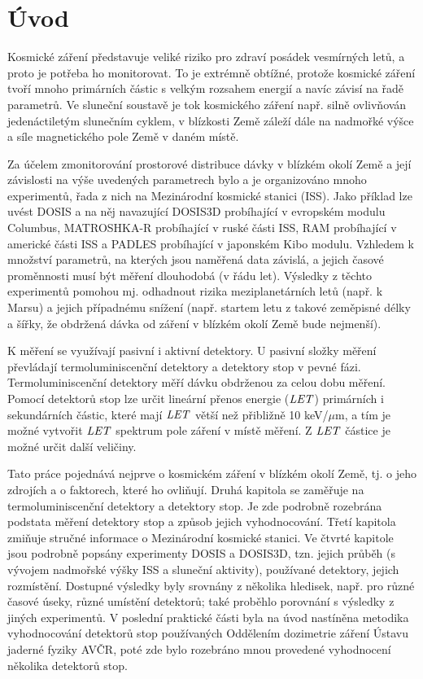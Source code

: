 \chapter*{Úvod}
\markright{}
Kosmické záření představuje veliké riziko pro zdraví posádek vesmírných letů, a proto je potřeba ho monitorovat. To je extrémně obtížné, protože kosmické záření tvoří mnoho primárních částic s velkým rozsahem energií a navíc závisí na řadě parametrů. Ve sluneční soustavě je tok kosmického záření např. silně ovlivňován jedenáctiletým slunečním cyklem, v blízkosti Země záleží dále na nadmořké výšce a síle magnetického pole Země v daném místě. 

Za účelem zmonitorování prostorové distribuce dávky v blízkém okolí Země a její závislosti na výše uvedených parametrech bylo a je organizováno mnoho experimentů, řada z nich na Mezinárodní kosmické stanici (ISS). Jako příklad lze uvést DOSIS a na něj navazující DOSIS3D probíhající v evropském modulu Columbus, MATROSHKA-R probíhající v ruské části ISS, RAM probíhající v americké části ISS a PADLES probíhající v japonském Kibo modulu. Vzhledem k množství parametrů, na kterých jsou naměřená data závislá, a jejich časové proměnnosti musí být měření dlouhodobá (v řádu let). Výsledky z těchto experimentů pomohou mj. odhadnout rizika meziplanetárních letů (např. k Marsu) a jejich případnému snížení (např. startem letu z takové zeměpisné délky a šířky, že obdržená dávka od záření v blízkém okolí Země bude nejmenší). 

K měření se využívají pasivní i aktivní detektory. U pasivní složky měření převládají termoluminiscenční detektory a detektory stop v pevné fázi. Termoluminiscenční detektory měří dávku obdrženou za celou dobu měření. Pomocí detektorů stop lze určit lineární přenos energie ($\mathit{LET}$) primárních i sekundárních částic, které mají $\mathit{LET}$ větší než přibližně 10 keV/$\mu$m, a tím je možné vytvořit $\mathit{LET}$ spektrum pole záření v místě měření. Z $\mathit{LET}$ částice je možné určit další veličiny.

Tato práce pojednává nejprve o kosmickém záření v blízkém okolí Země, tj. o jeho zdrojích a o faktorech, které ho ovliňují. Druhá kapitola se zaměřuje na termoluminiscenční detektory a detektory stop. Je zde podrobně rozebrána podstata měření detektory stop a způsob jejich vyhodnocování. Třetí kapitola zmiňuje stručné informace o Mezinárodní kosmické stanici. Ve čtvrté kapitole jsou podrobně popsány experimenty DOSIS a DOSIS3D, tzn. jejich průběh (s vývojem nadmořské výšky ISS a sluneční aktivity), používané detektory, jejich rozmístění. Dostupné výsledky byly srovnány z několika hledisek, např. pro různé časové úseky, různé umístění detektorů; také proběhlo porovnání s výsledky
z jiných experimentů. V poslední praktické části byla na úvod nastíněna metodika vyhodnocování detektorů stop používaných Oddělením dozimetrie záření Ústavu jaderné fyziky AVČR, poté zde bylo rozebráno mnou provedené vyhodnocení několika detektorů stop.
